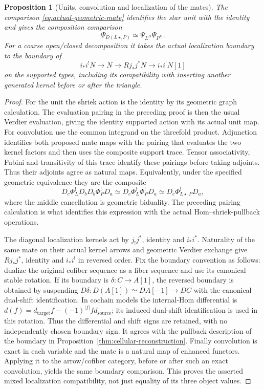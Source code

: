 \documentclass[11pt]{article}
\newtheorem{proposition}{Proposition}[section]
\theoremstyle{definition}
\theoremstyle{remark}
\begin{document}
\begin{proposition}[Units, convolution and localization of the mates]
\label{prop:mate-operations}
The comparison \eqref{eq:actual-geometric-mate} identifies the star unit
with the identity and gives the composition comparison
\[
 \Psi_{D(L\star_!P)}\simeq\Psi_{L^D}\Psi_{P^D}.
\]
For a coarse open/closed decomposition it takes the actual localization
boundary to the boundary of
\[
 i_*i^!N\longrightarrow N\longrightarrow Rj_*j^*N
                         \longrightarrow i_*i^!N[1]
\]
on the supported types, including its compatibility with inserting
another generated kernel before or after the triangle.
\end{proposition}
\begin{proof}
For the unit the shriek action is the identity by its geometric graph
calculation.  The evaluation pairing in the preceding proof is then
the usual Verdier evaluation, giving the identity supported action
with its actual unit map.  For convolution use the common integrand
on the threefold product.  Adjunction identifies both proposed mate
maps with the pairing that evaluates the two kernel factors and then
uses the composite support trace.  Tensor associativity, Fubini and
transitivity of this trace identify these pairings before taking
adjoints.  Thus their adjoints agree as natural maps.  Equivalently,
under the specified geometric equivalence they are the composite
\[
 D_c\Phi_L^!D_bD_b\Phi_P^!D_a
          \simeq D_c\Phi_L^!\Phi_P^!D_a
          \simeq D_c\Phi_{L\star_!P}^!D_a,
\]
where the middle cancellation is geometric biduality.  The preceding
pairing calculation is what identifies this expression with the
actual Hom--shriek-pullback operations.

The diagonal localization kernels act by $j_!j^*$, identity and
$i_*i^*$.  Naturality of the same mate on their actual kernel arrows
and geometric Verdier exchange give $Rj_*j^*$, identity and $i_*i^!$
in reversed order.  Fix the boundary convention as follows: dualize
the original cofiber sequence as a fiber sequence and use its
canonical stable rotation.  If its boundary is $\delta:C\to A[1]$,
the reversed boundary is obtained by suspending
$D\delta:D(A[1])\simeq DA[-1]\to DC$ with the canonical dual-shift
identification.  In cochain models the internal-Hom differential is
$d(f)=d_{\mathrm{target}}f-(-1)^{|f|}f d_{\mathrm{source}}$; its
induced dual-shift identification is used in this rotation.  Thus the
differential and shift signs are retained, with no independently
chosen boundary sign.  It agrees
with the pullback description of the boundary in
Proposition~\ref{thm:cellular-reconstruction}.
Finally convolution is exact in each variable and the mate is a
natural map of enhanced functors.  Applying it to the arrow/cofiber
category, before or after such an exact convolution, yields the same
boundary comparison.  This proves the asserted mixed localization
compatibility, not just equality of its three object values.
\end{proof}
\end{document}
